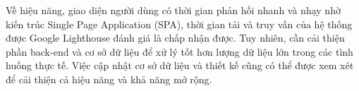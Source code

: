 Về hiệu năng, giao diện người dùng có thời gian phản hồi nhanh và nhạy nhờ kiến trúc Single Page Application (SPA), thời gian tải và truy vấn của hệ thống được Google Lighthouse đánh giá là chấp nhận được. Tuy nhiên, cần cải thiện phần back-end và cơ sở dữ liệu để xử lý tốt hơn lượng dữ liệu lớn trong các tình huống thực tế. Việc cập nhật cơ sở dữ liệu và thiết kế cũng có thể được xem xét để cải thiện cả hiệu năng và khả năng mở rộng.

